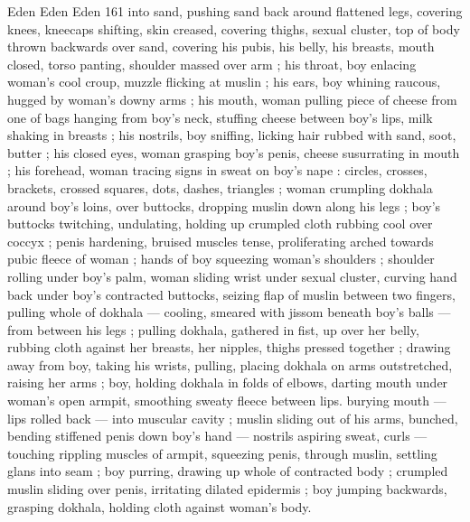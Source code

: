 Eden Eden Eden 161
into sand, pushing sand back around flattened legs, covering knees,
kneecaps shifting, skin creased, covering thighs, sexual cluster, top
of body thrown backwards over sand, covering his pubis, his belly,
his breasts, mouth closed, torso panting, shoulder massed over arm
; his throat, boy enlacing woman's cool croup, muzzle flicking at
muslin ; his ears, boy whining raucous, hugged by woman's downy
arms ; his mouth, woman pulling piece of cheese from one of bags
hanging from boy's neck, stuffing cheese between boy's lips, milk
shaking in breasts ; his nostrils, boy sniffing, licking hair rubbed with
sand, soot, butter ; his closed eyes, woman grasping boy's penis,
cheese susurrating in mouth ; his forehead, woman tracing signs in
sweat on boy's nape : circles, crosses, brackets, crossed squares,
dots, dashes, triangles ; woman crumpling dokhala around boy's
loins, over buttocks, dropping muslin down along his legs ; boy's
buttocks twitching, undulating, holding up crumpled cloth rubbing
cool over coccyx ; penis hardening, bruised muscles tense,
proliferating arched towards pubic fleece of woman ; hands of boy
squeezing woman's shoulders ; shoulder rolling under boy's palm,
woman sliding wrist under sexual cluster, curving hand back under
boy’s contracted buttocks, seizing flap of muslin between two
fingers, pulling whole of dokhala — cooling, smeared with jissom
beneath boy's balls — from between his legs ; pulling dokhala,
gathered in fist, up over her belly, rubbing cloth against her breasts,
her nipples, thighs pressed together ; drawing away from boy, taking
his wrists, pulling, placing dokhala on arms outstretched, raising her
arms ; boy, holding dokhala in folds of elbows, darting mouth under
woman's open armpit, smoothing sweaty fleece between lips.
burying mouth — lips rolled back — into muscular cavity ; muslin
sliding out of his arms, bunched, bending stiffened penis down boy's
hand — nostrils aspiring sweat, curls — touching rippling muscles
of armpit, squeezing penis, through muslin, settling glans into seam
; boy purring, drawing up whole of contracted body ; crumpled
muslin sliding over penis, irritating dilated epidermis ; boy jumping
backwards, grasping dokhala, holding cloth against woman's body.

